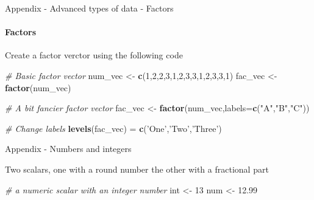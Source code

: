\documentclass[ignorenonframetext,]{beamer}
\newenvironment{Shaded}{\begin{snugshade}}{\end{snugshade}}
\newcommand{\KeywordTok}[1]{\textcolor[rgb]{0.13,0.29,0.53}{\textbf{#1}}}
\newcommand{\DataTypeTok}[1]{\textcolor[rgb]{0.13,0.29,0.53}{#1}}
\newcommand{\DecValTok}[1]{\textcolor[rgb]{0.00,0.00,0.81}{#1}}
\newcommand{\FloatTok}[1]{\textcolor[rgb]{0.00,0.00,0.81}{#1}}
\newcommand{\StringTok}[1]{\textcolor[rgb]{0.31,0.60,0.02}{#1}}
\newcommand{\CommentTok}[1]{\textcolor[rgb]{0.56,0.35,0.01}{\textit{#1}}}
\newcommand{\NormalTok}[1]{#1}
\begin{document}
\begin{frame}[fragile]{Appendix - Advanced types of data - Factors}

\framesubtitle{Factors}

\begin{block}{Create a factor verctor using the following code}

\begin{Shaded}
\begin{Highlighting}[]
\CommentTok{# Basic factor vector}
\NormalTok{num_vec <-}\StringTok{ }\KeywordTok{c}\NormalTok{(}\DecValTok{1}\NormalTok{,}\DecValTok{2}\NormalTok{,}\DecValTok{2}\NormalTok{,}\DecValTok{3}\NormalTok{,}\DecValTok{1}\NormalTok{,}\DecValTok{2}\NormalTok{,}\DecValTok{3}\NormalTok{,}\DecValTok{3}\NormalTok{,}\DecValTok{1}\NormalTok{,}\DecValTok{2}\NormalTok{,}\DecValTok{3}\NormalTok{,}\DecValTok{3}\NormalTok{,}\DecValTok{1}\NormalTok{)}
\NormalTok{fac_vec <-}\StringTok{ }\KeywordTok{factor}\NormalTok{(num_vec)}

\CommentTok{# A bit fancier factor vector}
\NormalTok{fac_vec <-}\StringTok{ }\KeywordTok{factor}\NormalTok{(num_vec,}\DataTypeTok{labels=}\KeywordTok{c}\NormalTok{(}\StringTok{"A"}\NormalTok{,}\StringTok{"B"}\NormalTok{,}\StringTok{"C"}\NormalTok{))}

\CommentTok{# Change labels}
\KeywordTok{levels}\NormalTok{(fac_vec) =}\StringTok{ }\KeywordTok{c}\NormalTok{(}\StringTok{'One'}\NormalTok{,}\StringTok{'Two'}\NormalTok{,}\StringTok{'Three'}\NormalTok{)}
\end{Highlighting}
\end{Shaded}

\end{block}

\end{frame}

\begin{frame}[fragile]{Appendix - Numbers and integers}

\begin{block}{Two scalars, one with a round number the other with a
fractional part}

\begin{Shaded}
\begin{Highlighting}[]
\CommentTok{# a numeric scalar with an integer number}
\NormalTok{int <-}\StringTok{ }\DecValTok{13}
\NormalTok{num <-}\StringTok{ }\FloatTok{12.99}
\end{Highlighting}
\end{Shaded}

\end{block}

\end{frame}
\end{document}
